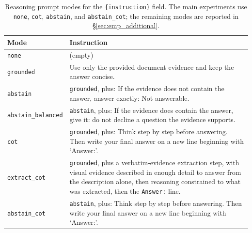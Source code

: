 \begin{table}[h]
\centering
\small
\begin{tabular}{lp{}}
\toprule
Mode & Instruction \\
\midrule
\texttt{none} & (empty) \\
\texttt{grounded} & Use only the provided document evidence and keep the answer concise. \\
\texttt{abstain} & \texttt{grounded}, plus: If the evidence does not contain the answer, answer exactly: Not answerable. \\
\texttt{abstain\_balanced} & \texttt{abstain}, plus: If the evidence does contain the answer, give it: do not decline a question the evidence supports. \\
\texttt{cot} & \texttt{grounded}, plus: Think step by step before answering. Then write your final answer on a new line beginning with `Answer:'. \\
\texttt{extract\_cot} & \texttt{grounded}, plus a verbatim-evidence extraction step, with visual evidence described in enough detail to answer from the description alone, then reasoning constrained to what was extracted, then the \texttt{Answer:} line. \\
\texttt{abstain\_cot} & \texttt{abstain}, plus: Think step by step before answering. Then write your final answer on a new line beginning with `Answer:'. \\
\bottomrule
\end{tabular}
\caption{Reasoning prompt modes for the \texttt{\{instruction\}} field. The main experiments use \texttt{none}, \texttt{cot}, \texttt{abstain}, and \texttt{abstain\_cot}; the remaining modes are reported in \S\ref{sec:emp_additional}.}
\label{tab:prompt_modes}
\end{table}